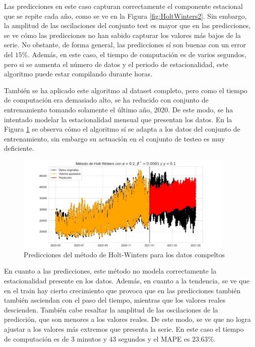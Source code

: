 \documentclass[12pt,twoside]{article}
\begin{document}
Las predicciones en este caso capturan correctamente el componente estacional que se repite cada año, como se ve en la Figura \ref{fig:HoltWinters2}. Sin embargo, la amplitud de las oscilaciones del conjunto test es mayor que en las predicciones, se ve cómo las predicciones no han sabido capturar los valores más bajos de la serie. No obstante, de forma general, las predicciones sí son buenas con un error del $15\%$. Además, en este caso, el tiempo de computación es de varios segundos, pero si se aumenta el número de datos y el periodo de estacionalidad, este algoritmo puede estar compilando durante horas.




También se ha aplicado este algoritmo al dataset completo, pero como el tiempo de computación era demasiado alto, se ha reducido con conjunto de entrenamiento tomando solamente el último año, 2020. De este modo, se ha intentado modelar la estacionalidad mensual que presentan los datos. En la Figura \ref{fig:HoltWinters4} se observa cómo el algoritmo sí se adapta a los datos del conjunto de entrenamiento, sin embargo su actuación en el conjunto de testeo es muy deficiente.
\begin{figure}[h]
    \centering
    \includegraphics[width = 0.95\textwidth]{imagenes/HoltWinters4.jpg}
    \caption{Predicciones del método de Holt-Winters para los datos compeltos}\label{fig:HoltWinters4}
\end{figure}

En cuanto a las predicciones, este método no modela correctamente la estacionalidad presente en los datos. Además, en cuanto a la tendencia, se ve que en el train hay cierto crecimiento que provoca que en las predicciones también también asciendan con el paso del tiempo, mientras que los valores reales descienden. También cabe resaltar la amplitud de las oscilaciones de la predicción, que son menores a los valores reales. De este modo, se ve que no logra ajustar a los valores más extremos que presenta la serie. En este caso el tiempo de computación es de $3$ minutos y $43$ segundos y el MAPE es $23.63\%$.
\end{document}
